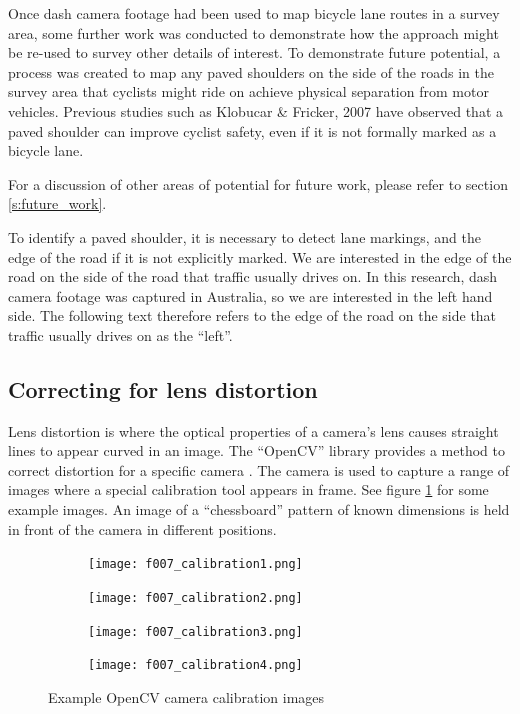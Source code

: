 \documentclass[11pt,twoside]{report}
\begin{document}
Once dash camera footage had been used to map bicycle lane routes in a survey area, some further work was conducted to demonstrate how the approach might be re-used to survey other details of interest.  To demonstrate future potential, a process was created to map any paved shoulders on the side of the roads in the survey area that cyclists might ride on achieve physical separation from motor vehicles.  Previous studies such as Klobucar \& Fricker, 2007 \cite{BIKESAFETY} have observed that a paved shoulder can improve cyclist safety, even if it is not formally marked as a bicycle lane.

For a discussion of other areas of potential for future work, please refer to section \ref{s:future_work}.

To identify a paved shoulder, it is necessary to detect lane markings, and the edge of the road if it is not explicitly marked.  We are interested in the edge of the road on the side of the road that traffic usually drives on.  In this research, dash camera footage was captured in Australia, so we are interested in the left hand side.  The following text therefore refers to the edge of the road on the side that traffic usually drives on as the ``left''.


\subsection{Correcting for lens distortion}

Lens distortion is where the optical properties of a camera's lens causes straight lines to appear curved in an image.  The ``OpenCV'' library provides a method to correct distortion for a specific camera \cite{distortion}.  The camera is used to capture a range of images where a special calibration tool appears in frame.  See figure \ref{fig:calibration} for some example images.  An image of a ``chessboard'' pattern of known dimensions is held in front of the camera in different positions.

\begin{figure}[h]
\centering
\begin{subfigure}{0.24\textwidth}
	\texttt{[image: f007\_calibration1.png]}
\end{subfigure}
\hfill
\begin{subfigure}{0.24\textwidth}
	\texttt{[image: f007\_calibration2.png]}
\end{subfigure}
\hfill
\begin{subfigure}{0.24\textwidth}
	\texttt{[image: f007\_calibration3.png]}
\end{subfigure}
\hfill
\begin{subfigure}{0.24\textwidth}
	\texttt{[image: f007\_calibration4.png]}
\end{subfigure}
\caption{Example OpenCV camera calibration images}
\label{fig:calibration}
\end{figure}
\end{document}
